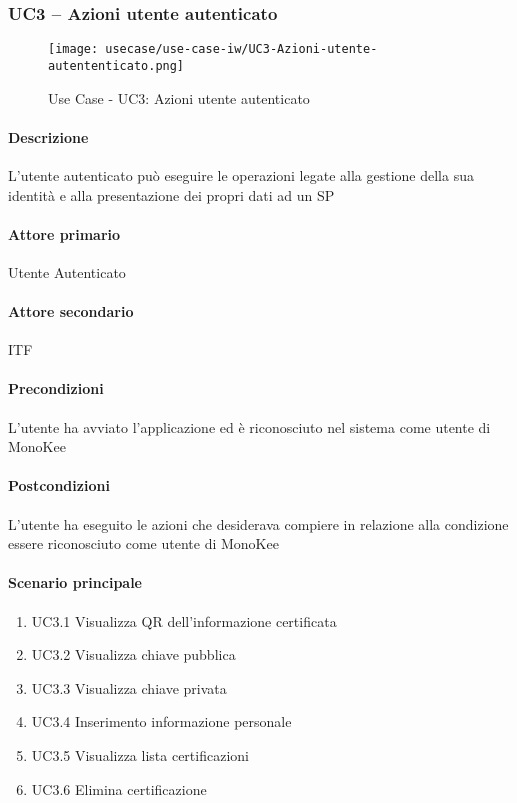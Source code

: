 \subsubsection{UC3 – Azioni utente autenticato}
\begin{figure}[!htbp] 
    \centering 
    \texttt{[image: usecase/use-case-iw/UC3-Azioni-utente-autententicato.png]} 
    \caption{Use Case - UC3: Azioni utente autenticato}
\end{figure}

\paragraph{Descrizione}  L’utente autenticato può eseguire le operazioni legate alla gestione della sua identità e alla presentazione dei propri dati ad un SP
\paragraph{Attore primario}  Utente Autenticato
\paragraph{Attore secondario}  ITF
\paragraph{Precondizioni}  L’utente ha avviato l’applicazione ed è riconosciuto nel sistema come utente di MonoKee
\paragraph{Postcondizioni}  L’utente ha eseguito le azioni che desiderava compiere in relazione alla condizione essere riconosciuto come utente di MonoKee
\paragraph{Scenario principale}  
    \begin{enumerate}
        \item UC3.1 Visualizza QR dell’informazione certificata
        \item UC3.2 Visualizza chiave pubblica
        \item UC3.3 Visualizza chiave privata
        \item UC3.4 Inserimento informazione personale
        \item UC3.5 Visualizza lista certificazioni
        \item UC3.6 Elimina certificazione
    \end{enumerate}
